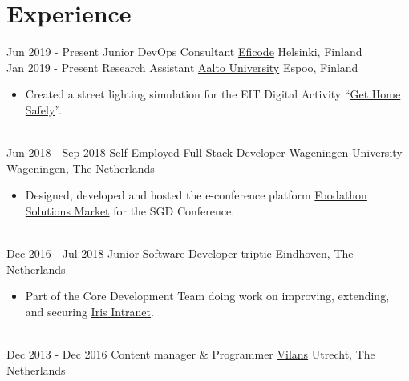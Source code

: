 \documentclass[a4paper]{twentysecondcv} %
\begin{document}
\section{Experience}
\begin{twentyshort} %
    \twentyitem
    	{Jun 2019 -}
		{Present}
        {Junior DevOps Consultant}
		{\href{https://eficode.com}{Eficode}}
        {Helsinki, Finland}
        {%
        }
        \\
    \twentyitem
    	{Jan 2019 -}
		{Present}
        {Research Assistant}
		{\href{https://www.aalto.fi/en}{Aalto University}}
        {Espoo, Finland}
        {
        \begin{itemize}
			\item Created a street lighting simulation for the EIT Digital Activity ``\href{https://cyphylab.chora.tu-berlin.de/gethomesafely/}{Get Home Safely}''.
        \end{itemize}
        }
        \\
    \twentyitem
    	{Jun 2018 -}
		{Sep 2018}
        {Self-Employed Full Stack Developer}
		{\href{https://wur.nl/en}{Wageningen University}}
        {Wageningen, The Netherlands}
        {
        \begin{itemize}
			\item Designed, developed and hosted the e-conference platform \href{https://foodathon.github.io/}{Foodathon Solutions Market} for the SGD Conference.
        \end{itemize}
        }
        \\
    \twentyitem
    	{Dec 2016 -}
		{Jul 2018}
        {Junior Software Developer}
		{\href{http://triptic.nl}{triptic}}
        {Eindhoven, The Netherlands}
        {
        \begin{itemize}
            \item Part of the Core Development Team doing work on improving, extending, and securing \href{https://www.irisintranet.com/}{Iris Intranet}.
        \end{itemize}
        }
        \\
	\twentyitem
    	{Dec 2013 -}
		{Dec 2016}
		{Content manager \& Programmer}
		{\href{http://www.vilans.org/}{Vilans}}
        {Utrecht, The Netherlands}
        {}
\end{twentyshort}
\end{document}

